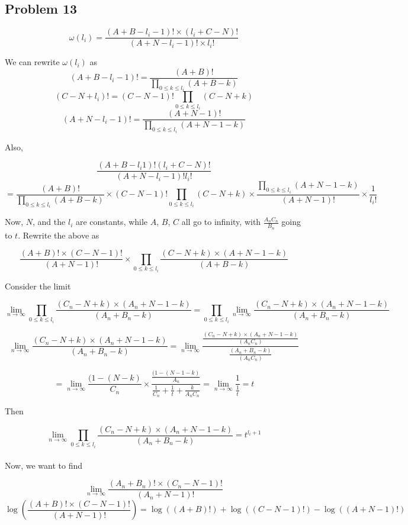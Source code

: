 \documentclass[12pt]{article}
\begin{document}
	
	\subsection*{Problem 13}

$$\omega(l_i) = \frac{(A + B - l_i - 1)! \times (l_i + C - N)!}{(A + N - l_i - 1)! \times l_i!}$$

We can rewrite $\omega(l_i)$ as
$$(A + B - l_i - 1)! = \frac{(A + B)!}{\prod_{0 \leq k \leq l_i}(A + B - k)}$$
$$ (C - N + l_i)! = (C - N - 1)! \prod_{0 \leq k \leq l_i}(C - N + k)$$
$$(A + N - l_i - 1)! = \frac{(A + N -1)!}{\prod_{0 \leq k \leq l_i}(A + N -1 -k)}$$

Also,

$$\frac{(A +B - l_i 1)! (l_i + C - N)!}{(A + N - l_i - 1)! l_i!}$$
$$=\frac{(A + B)!}{\prod_{0 \leq k \leq l_i} (A + B - k)} \times (C - N - 1)! \prod_{0 \leq k \leq l_i} (C - N + k) \times \frac{\prod_{0 \leq k \leq l_i}(A + N - 1 - k)}{(A + N - 1)!} \times \frac{1}{l_i!}$$

Now, $N$, and the $l_i$ are constants, while $A$, $B$, $C$ all go to infinity, with $\frac{A_n C_n}{B_n}$ going to $t$. Rewrite the above as

$$\frac{(A+ B)! \times (C-N - 1)!}{(A + N- 1)!} \times \prod_{0 \leq k \leq l_i} \frac{(C-N + k)\times (A+N-1-k)}{(A + B - k)}$$

Consider the limit

$$\lim_{n \rightarrow \infty} \prod_{0 \leq k \leq l_i} \frac{(C_n - N + k)\times (A_n + N - 1 - k)}{(A_n + B_n - k)} = \prod_{0 \leq k \leq l_i} \lim_{n \rightarrow \infty} \frac{(C_n - N + k)\times (A_n + N - 1 - k)}{(A_n + B_n - k)}$$

$$\lim_{n \rightarrow \infty} \frac{(C_n - N + k)\times (A_n + N - 1 - k)}{(A_n + B_n - k)} = \lim_{n \rightarrow \infty}\frac{\frac{(C_n - N + k) \times (A_n + N - 1 - k)}{(A_n C_n )}}{\frac{(A_n + B_n - k)}{(A_n C_n)}}$$

$$= \lim_{n \rightarrow \infty} \frac{( 1 - (N - k)}{C_n} \times \frac{\frac{( 1 - (N - 1 - k)}{A_n}}{\frac{1}{C_n} + \frac{1}{t} + \frac{k}{A_n C_n}} = \lim_{n \rightarrow \infty} \frac{1}{\frac{1}{t}} = t$$

Then

$$\lim_{n \rightarrow \infty} \prod_{0 \leq k \leq l_i} \frac{(C_n - N + k)\times (A_n+N-1-k)}{(A_n + B_n - k)} = t^{l_i + 1} $$\\

Now, we want to find

$$\lim_{n \rightarrow \infty} \frac{(A_n+ B_n)! \times (C_n-N - 1)!}{(A_n + N- 1)!}$$
$$\log \left( \frac{(A+B)! \times (C - N - 1)!}{(A + N - 1)!}\right) 
= \log((A+B)!) + \log((C-N-1)!) - \log(( A + N - 1)!)$$ \\
\end{document}
